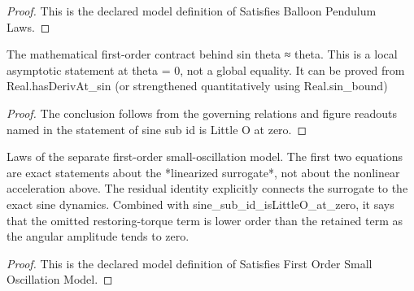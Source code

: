 \begin{proof}
  This is the declared model definition of Satisfies Balloon Pendulum Laws.
\end{proof}
\begin{theorem}
  \label{thm:physics:phyx-mini-0234:phyxminiproblems-problemphyxmini0234-sine-sub-id-islittleo-at-zero}
  The mathematical first-order contract behind sin theta ≈ theta. This is a local asymptotic statement at theta = 0, not a global equality. It can be proved from Real.hasDerivAt\_sin (or strengthened quantitatively using Real.sin\_bound)
\end{theorem}
\begin{proof}
  The conclusion follows from the governing relations and figure readouts named in the statement of sine sub id is Little O at zero.
\end{proof}
\begin{definition}
  \label{def:physics:phyx-mini-0234:phyxminiproblems-problemphyxmini0234-satisfiesfirstordersmalloscillationmodel}
  Laws of the separate first-order small-oscillation model. The first two equations are exact statements about the *linearized surrogate*, not about the nonlinear acceleration above. The residual identity explicitly connects the surrogate to the exact sine dynamics. Combined with sine\_sub\_id\_isLittleO\_at\_zero, it says that the omitted restoring-torque term is lower order than the retained term as the angular amplitude tends to zero.
\end{definition}
\begin{proof}
  This is the declared model definition of Satisfies First Order Small Oscillation Model.
\end{proof}
